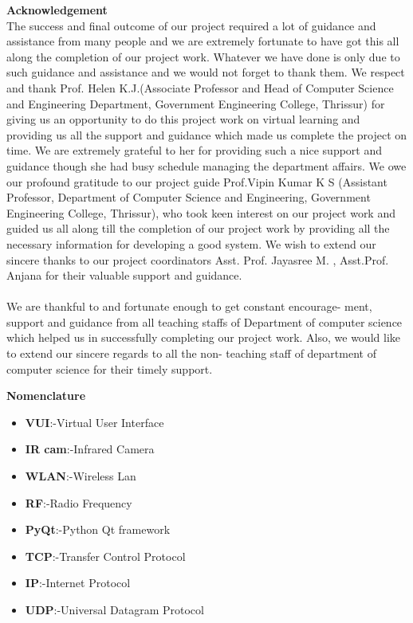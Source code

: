 \documentclass[12pt]{report}
\begin{document}
\newpage
\textbf {\huge Acknowledgement}\\
\newline
\newline
\hspace{2cm}
The success and final outcome of our project required a lot of guidance and assistance from many people and we are extremely fortunate to have got this all along the completion of our project work. Whatever we have done is only due to such guidance and assistance and we would not forget to thank them. We respect and thank Prof. Helen K.J.(Associate Professor and Head of Computer Science and Engineering Department, Government Engineering College, Thrissur) for giving us an opportunity to do this project work on virtual learning and providing us all the support and guidance which made us complete the project on time. We are extremely grateful to her for providing such a nice support and guidance though she had busy schedule managing the department affairs. We owe our profound gratitude to our project guide Prof.Vipin Kumar K S (Assistant Professor, Department of Computer Science and Engineering, Government Engineering College, Thrissur), who took keen interest on our project work and guided us all along till the completion of our project work by providing all the necessary information for developing a good system. We wish to extend our sincere thanks to our project coordinators Asst. Prof. Jayasree M. , Asst.Prof. Anjana for their valuable support and guidance.\\\\
We are thankful to and fortunate enough to get constant encourage-
ment, support and guidance from all teaching staffs of Department of computer science which helped us in successfully completing our project work. Also, we would like to extend our sincere regards to all the non- teaching staff of department of computer science for their timely support.

\newpage


\tableofcontents



\newpage
\listoffigures

\newpage
\textbf {\huge Nomenclature}\\
\newline
\begin{itemize}
\item \textbf{VUI}:-Virtual User Interface
\item \textbf{IR cam}:-Infrared Camera
\item \textbf{WLAN}:-Wireless Lan
\item \textbf{RF}:-Radio Frequency
\item \textbf{PyQt}:-Python Qt framework
\item \textbf{TCP}:-Transfer Control Protocol
\item \textbf{IP}:-Internet Protocol
\item \textbf{UDP}:-Universal Datagram Protocol

\end{itemize}
\end{document}
